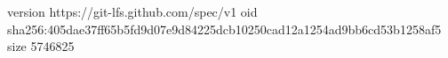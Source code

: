 version https://git-lfs.github.com/spec/v1
oid sha256:405dae37ff65b5fd9d07e9d84225dcb10250cad12a1254ad9bb6cd53b1258af5
size 5746825

